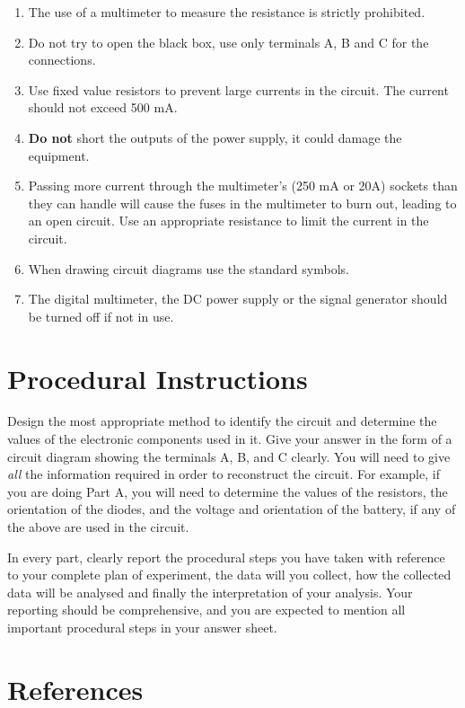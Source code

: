 \begin{enumerate}
\item The use of a multimeter to measure the resistance is strictly prohibited.
\item Do not try to open the black box, use only terminals A, B and C for the connections.
\item Use fixed value resistors to prevent large currents in the circuit. The current should not exceed 500 mA.
\item \textbf{Do not} short the outputs of the power supply, it could damage the equipment.
\item Passing more current through the multimeter's (250 mA or 20A) sockets than they can handle will cause the fuses in the multimeter to burn out, leading to an open circuit. Use an appropriate resistance to limit the current in the circuit.
\item When drawing circuit diagrams use the standard symbols.
\item The digital multimeter, the DC power supply or the signal generator should be turned off if not in use.

\end{enumerate}


\section*{Procedural Instructions}

Design the most appropriate method to identify the circuit and determine the values of the electronic components used  in it. Give your answer in the form of a circuit diagram showing the terminals A, B, and C clearly. You will need to give \textit{all} the information required in order to reconstruct the circuit. For example, if you are doing Part A, you will need to determine the values of the resistors, the orientation of the diodes, and the voltage and orientation of the battery, if any of the above are used in the circuit.

In every part, clearly report the procedural steps you have taken with reference to your complete plan of experiment, the data will you collect, how the collected data will be analysed and finally the interpretation of your analysis. Your reporting should be comprehensive, and you are expected to mention all important procedural steps in your answer sheet.



\section*{References}


